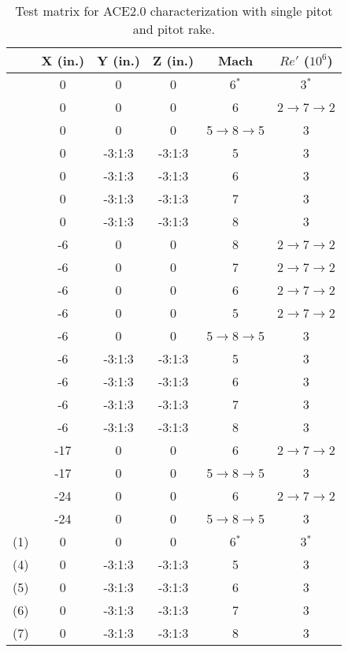 \setcounter{rownum}{0}
\begin{table}[ht!]
    \centering
    \begin{tabular}{|>{\stepcounter{rownum}\therownum}c|c|c|c|c|c|}
        \hline
        \multicolumn{1}{|c|}{\textbf{Run}} & \textbf{X (in.)} & \textbf{Y (in.)} & \textbf{Z (in.)} & \textbf{Mach} & \textbf{$Re'$ ($10^6$)} \\ \hline
        & 0 & 0 & 0 & 6$^*$ & 3$^*$ \\ \hline
        & 0 & 0 & 0 & 6 & 2$\to$7$\to$2 \\ \hline
        & 0 & 0 & 0 & 5$\to$8$\to$5 & 3 \\ \hline
        & 0 & -3:1:3 & -3:1:3 & 5 & 3 \\ \hline
        & 0 & -3:1:3 & -3:1:3 & 6 & 3 \\ \hline
        & 0 & -3:1:3 & -3:1:3 & 7 & 3 \\ \hline
        & 0 & -3:1:3 & -3:1:3 & 8 & 3 \\ \hline
        & -6 & 0 & 0 & 8 & 2$\to$7$\to$2 \\ \hline
        & -6 & 0 & 0 & 7 & 2$\to$7$\to$2 \\ \hline
        & -6 & 0 & 0 & 6 & 2$\to$7$\to$2 \\ \hline
        & -6 & 0 & 0 & 5 & 2$\to$7$\to$2 \\ \hline
        & -6 & 0 & 0 & 5$\to$8$\to$5 & 3 \\ \hline
        & -6 & -3:1:3 & -3:1:3 & 5 & 3 \\ \hline
        & -6 & -3:1:3 & -3:1:3 & 6 & 3 \\ \hline
        & -6 & -3:1:3 & -3:1:3 & 7 & 3 \\ \hline
        & -6 & -3:1:3 & -3:1:3 & 8 & 3 \\ \hline
        & -17 & 0 & 0 & 6 & 2$\to$7$\to$2 \\ \hline
        & -17 & 0 & 0 & 5$\to$8$\to$5 & 3 \\ \hline
        & -24 & 0 & 0 & 6 & 2$\to$7$\to$2 \\ \hline
        & -24 & 0 & 0 & 5$\to$8$\to$5 & 3 \\ \hline
        (1) & 0 & 0 & 0 & 6$^*$ & 3$^*$ \\ \hline
        (4) & 0 & -3:1:3 & -3:1:3 & 5 & 3 \\ \hline
        (5) & 0 & -3:1:3 & -3:1:3 & 6 & 3 \\ \hline
        (6) & 0 & -3:1:3 & -3:1:3 & 7 & 3 \\ \hline
        (7) & 0 & -3:1:3 & -3:1:3 & 8 & 3 \\ \hline
    \end{tabular}
    \caption{Test matrix for ACE2.0 characterization with single pitot and pitot rake.}
    \label{tab:ace2-survey-rake}
\end{table}

